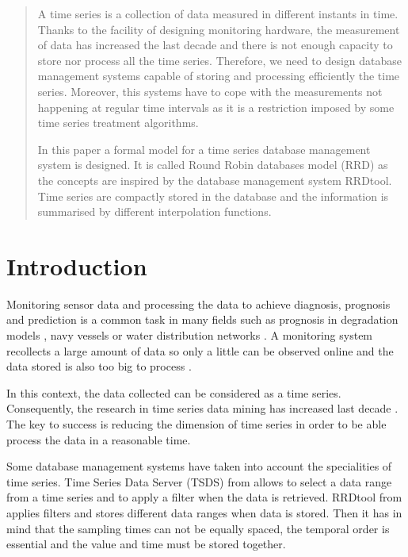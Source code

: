 \begin{abstract}
  A time series is a collection of data measured in different instants
  in time. Thanks to the facility of designing monitoring hardware,
  the measurement of data has increased the last decade and there is
  not enough capacity to store nor process all the time
  series. Therefore, we need to design database management systems
  capable of storing and processing efficiently the time
  series. Moreover, this systems have to cope with the measurements
  not happening at regular time intervals as it is a restriction
  imposed by some time series treatment algorithms.

  In this paper a formal model for a time series database management
  system is designed.  It is called Round Robin databases model (RRD)
   as the concepts are
  inspired by the database management system RRDtool. Time series are
  compactly stored in the database and the information is summarised
  by different interpolation functions.
\end{abstract}

\section{Introduction}

Monitoring sensor data and processing the data to achieve diagnosis,
prognosis and prediction is a common task in many fields such as
prognosis in degradation models \parencite{yu11}, navy
vessels \parencite{palmer07} or water distribution
networks \parencite{quevedo10}.  A monitoring system recollects a
large amount of data so only a little can be observed online and the
data stored is also too big to process \parencite{keogh97}.

In this context, the data collected can be considered as a time
series. Consequently, the research in time series data mining has
increased last decade \parencite{fu11}.  The key to success is
reducing the dimension of time series in order to be able process the
data in a reasonable time.

Some database management systems have taken into account the
specialities of time series.  Time Series Data Server (TSDS) from
\textcite{weigel10} allows to select a data range from a time series and
to apply a filter when the data is retrieved.  RRDtool from
\textcite{rrdtool} applies filters and stores different data ranges when
data is stored. Then it has in mind that the sampling times can not be
equally spaced, the temporal order is essential and the value and time
must be stored together. 

